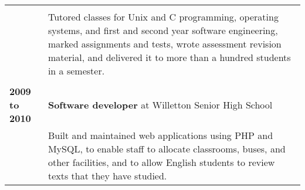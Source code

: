 \documentclass[a4paper,12pt]{article}
\begin{document}
\begin{tabular}{p{35mm}p{125mm}}
	\vspace{0.2em}  \\                              & Tutored classes for Unix and C programming, operating systems, and first and second year software engineering, marked assignments and tests, wrote assessment revision material, and delivered it to more than a hundred students in a semester.
	\\              \\  \textbf{2009 to 2010}       & \textbf{Software developer} at Willetton Senior High School
	\vspace{0.2em}  \\                              & Built and maintained web applications using PHP and MySQL, to enable staff to allocate classrooms, buses, and other facilities, and to allow English students to review texts that they have studied.
\end{tabular}
\end{document}
